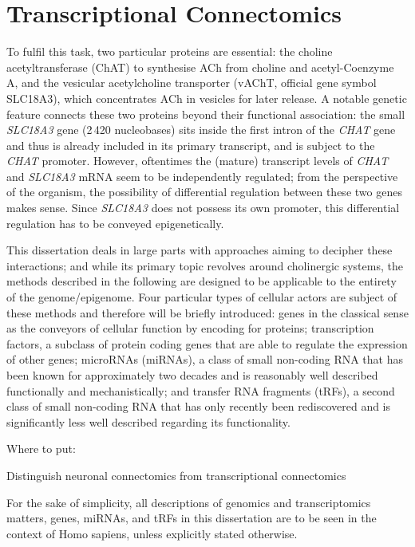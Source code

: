 \section{Transcriptional Connectomics}
 To fulfil this task, two particular proteins are essential: the choline acetyltransferase (ChAT) to synthesise ACh from choline and acetyl-Coenzyme A, and the vesicular acetylcholine transporter (vAChT, official gene symbol SLC18A3), which concentrates ACh in vesicles for later release. A notable genetic feature connects these two proteins beyond their functional association: the small \textit{SLC18A3} gene (2\,420 nucleobases) sits inside the first intron of the \textit{CHAT} gene and thus is already included in its primary transcript, and is subject to the \textit{CHAT} promoter. However, oftentimes the (mature) transcript levels of \textit{CHAT} and \textit{SLC18A3} mRNA seem to be independently regulated; from the perspective of the organism, the possibility of differential regulation between these two genes makes sense. Since \textit{SLC18A3} does not possess its own promoter, this differential regulation has to be conveyed epigenetically. 

This dissertation deals in large parts with approaches aiming to decipher these interactions; and while its primary topic revolves around cholinergic systems, the methods described in the following are designed to be applicable to the entirety of the genome/epigenome. Four particular types of cellular actors are subject of these methods and therefore will be briefly introduced: genes in the classical sense as the conveyors of cellular function by encoding for proteins; transcription factors, a subclass of protein coding genes that are able to regulate the expression of other genes; microRNAs (miRNAs), a class of small non-coding RNA that has been known for approximately two decades and is reasonably well described functionally and mechanistically; and transfer RNA fragments (tRFs), a second class of small non-coding RNA that has only recently been rediscovered and is significantly less well described regarding its functionality.

Where to put:

Distinguish neuronal connectomics from transcriptional connectomics

For the sake of simplicity, all descriptions of genomics and transcriptomics matters, genes, miRNAs, and tRFs in this dissertation are to be seen in the context of Homo sapiens, unless explicitly stated otherwise.

